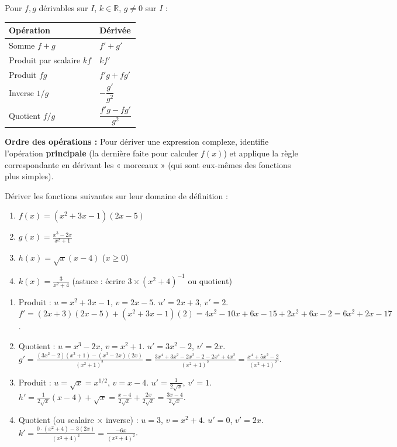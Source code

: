 \documentclass[11pt]{article}
\begin{document}
\begin{aretenir}
Pour $f, g$ dérivables sur $I$, $k \in \mathbb{R}$, $g \neq 0$ sur $I$ :
\begin{center}
\begin{tabularx}{\linewidth}{|l|X|}\hline
\textbf{Opération} & \textbf{Dérivée} \\ \hline
Somme $f+g$ & $f' + g'$ \\ \hline
Produit par scalaire $kf$ & $k f'$ \\ \hline
Produit $fg$ & $f'g + fg'$ \\ \hline
Inverse $1/g$ & $-\dfrac{g'}{g^2}$ \\ \hline
Quotient $f/g$ & $\dfrac{f'g - fg'}{g^2}$ \\ \hline
\end{tabularx}
\end{center}
\textbf{Ordre des opérations :} Pour dériver une expression complexe, identifie l'opération \textbf{principale} (la dernière faite pour calculer $f(x)$) et applique la règle correspondante en dérivant les « morceaux » (qui sont eux-mêmes des fonctions plus simples).
\end{aretenir}

\begin{exercice}[Entraînement]
Dériver les fonctions suivantes sur leur domaine de définition :
\begin{enumerate}
    \item $f(x) = (x^2 + 3x - 1)(2x - 5)$
    \item $g(x) = \frac{x^3 - 2x}{x^2 + 1}$
    \item $h(x) = \sqrt{x}(x - 4)$ \quad ($x \ge 0$)
    \item $k(x) = \frac{3}{x^2 + 4}$ \quad (astuce : écrire $3 \times (x^2+4)^{-1}$ ou quotient)
\end{enumerate}
\end{exercice}

\begin{corrige}[Exercice n°1]
\begin{enumerate}
    \item Produit : $u=x^2+3x-1$, $v=2x-5$. $u'=2x+3$, $v'=2$.
    $f' = (2x+3)(2x-5) + (x^2+3x-1)(2) = 4x^2-10x+6x-15 + 2x^2+6x-2 = 6x^2+2x-17$.
    \item Quotient : $u=x^3-2x$, $v=x^2+1$. $u'=3x^2-2$, $v'=2x$.
    $g' = \frac{(3x^2-2)(x^2+1) - (x^3-2x)(2x)}{(x^2+1)^2} = \frac{3x^4+3x^2-2x^2-2 - 2x^4+4x^2}{(x^2+1)^2} = \frac{x^4+5x^2-2}{(x^2+1)^2}$.
    \item Produit : $u=\sqrt{x}=x^{1/2}$, $v=x-4$. $u'=\frac{1}{2\sqrt{x}}$, $v'=1$.
    $h' = \frac{1}{2\sqrt{x}}(x-4) + \sqrt{x} = \frac{x-4}{2\sqrt{x}} + \frac{2x}{2\sqrt{x}} = \frac{3x-4}{2\sqrt{x}}$.
    \item Quotient (ou scalaire $\times$ inverse) : $u=3$, $v=x^2+4$. $u'=0$, $v'=2x$.
    $k' = \frac{0 \cdot (x^2+4) - 3(2x)}{(x^2+4)^2} = \frac{-6x}{(x^2+4)^2}$.
\end{enumerate}
\end{corrige}
\end{document}
